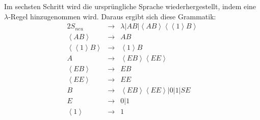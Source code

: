 \documentclass[10pt,a4paper,oneside,ngerman,numbers=noenddot]{scrartcl}
\begin{document}
Im sechsten Schritt wird die ursprüngliche Sprache wiederhergestellt, indem eine $\lambda$-Regel hinzugenommen wird. Daraus ergibt sich diese Grammatik:\\
\begin{alignat*}{2}
S_{neu} &\rightarrow & \lambda | AB | \left\langle AB \right\rangle \left\langle \left\langle 1 \right\rangle B \right\rangle \\
\left\langle AB \right\rangle &\rightarrow & AB \\
\left\langle \left\langle 1 \right\rangle B \right\rangle &\rightarrow &\left\langle 1 \right\rangle B \\
A &\rightarrow & \left\langle EB \right\rangle \left\langle EE \right\rangle \\
\left\langle EB \right\rangle &\rightarrow & EB \\
\left\langle EE \right\rangle &\rightarrow & EE \\
B &\rightarrow & \left\langle EB \right\rangle \left\langle EE \right\rangle | 0 | 1 | SE \\
E &\rightarrow & 0 | 1 \\
\left\langle 1 \right\rangle &\rightarrow & 1
\end{alignat*}
\section{} %
\end{document}
